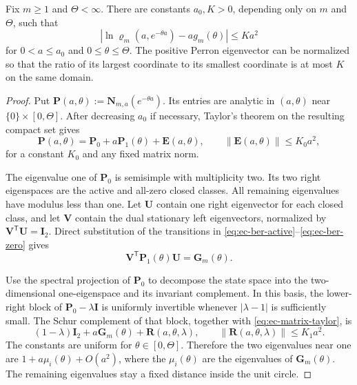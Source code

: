 \begin{lemma}
\label{lem:ec-two-class-perturbation}
Fix $m\geq1$ and $\Theta<\infty$.  There are constants
$a_0,K>0$, depending only on $m$ and $\Theta$, such that
\begin{equation}
 \left|
 \ln\varrho_m(a,e^{-\theta a})-a g_m(\theta)
 \right|\leq Ka^2
 \label{eq:ec-uniform-perturbation}
\end{equation}
for $0<a\leq a_0$ and $0\leq\theta\leq\Theta$.
The positive Perron eigenvector can be normalized so that the ratio of its
largest coordinate to its smallest coordinate is at most $K$ on the same
domain.
\end{lemma}

\begin{proof}
Put $\mathbf P(a,\theta):=\mathbf N_{m,a}(e^{-\theta a})$.
Its entries are analytic in $(a,\theta)$ near
$\{0\}\times[0,\Theta]$.  After decreasing $a_0$ if necessary, Taylor's
theorem on the resulting compact set gives
\begin{equation}
 \mathbf P(a,\theta)=\mathbf P_0+a\mathbf P_1(\theta)
 +\mathbf E(a,\theta),
 \qquad \|\mathbf E(a,\theta)\|\leq K_0a^2,
 \label{eq:ec-matrix-taylor}
\end{equation}
for a constant $K_0$ and any fixed matrix norm.

The eigenvalue one of $\mathbf P_0$ is semisimple with multiplicity two.
Its two right eigenspaces are the active and all-zero closed classes.
All remaining eigenvalues have modulus less than one.  Let $\mathbf U$
contain one right eigenvector for each closed class, and let $\mathbf V$
contain the dual stationary left eigenvectors, normalized by
$\mathbf V^{\mathsf T}\mathbf U=\mathbf I_2$.  Direct substitution of the
transitions in \eqref{eq:ec-ber-active}--\eqref{eq:ec-ber-zero} gives
\begin{equation}
 \mathbf V^{\mathsf T}\mathbf P_1(\theta)\mathbf U
 =\mathbf G_m(\theta).
 \label{eq:ec-compressed-derivative}
\end{equation}

Use the spectral projection of $\mathbf P_0$ to decompose the state space
into the two-dimensional one-eigenspace and its invariant complement.  In
this basis, the lower-right block of
$\mathbf P_0-\lambda\mathbf I$ is uniformly invertible whenever
$|\lambda-1|$ is sufficiently small.  The Schur complement of that block,
together with \eqref{eq:ec-matrix-taylor}, is
\begin{equation}
 (1-\lambda)\mathbf I_2
 +a\mathbf G_m(\theta)+\mathbf R(a,\theta,\lambda),
 \qquad \|\mathbf R(a,\theta,\lambda)\|\leq K_1a^2.
 \label{eq:ec-schur-complement}
\end{equation}
The constants are uniform for $\theta\in[0,\Theta]$.  Therefore the two
eigenvalues near one are
$1+a\mu_i(\theta)+O(a^2)$, where the $\mu_i(\theta)$ are the eigenvalues of
$\mathbf G_m(\theta)$.  The remaining eigenvalues stay a fixed distance
inside the unit circle.


\end{proof}
